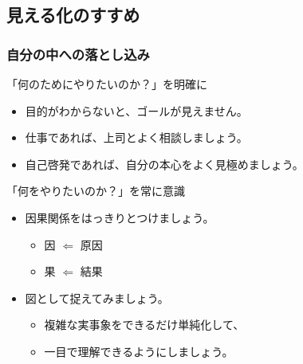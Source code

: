 \documentclass[unicode,12pt]{beamer}%
\begin{document}
\subsection{見える化のすすめ}
\begin{frame}
	\frametitle{自分の中への落とし込み}
		\begin{block}{「何のためにやりたいのか？」を明確に}
			\begin{itemize}
				\item 目的がわからないと、ゴールが見えません。
				\item 仕事であれば、上司とよく相談しましょう。
				\item 自己啓発であれば、自分の本心をよく見極めましょう。
			\end{itemize}
		\end{block}
		\pause
		\begin{block}{「何をやりたいのか？」を常に意識}
			\begin{itemize}
				\item 因果関係をはっきりとつけましょう。
				\begin{itemize}
					\item 因 $\Leftarrow$ 原因
					\item 果 $\Leftarrow$ 結果
				\end{itemize}
				\item 図として捉えてみましょう。
				\begin{itemize}
					\item 複雑な実事象をできるだけ単純化して、
					\item 一目で理解できるようにしましょう。
				\end{itemize}
			\end{itemize}
		\end{block}
\end{frame}
\end{document}
